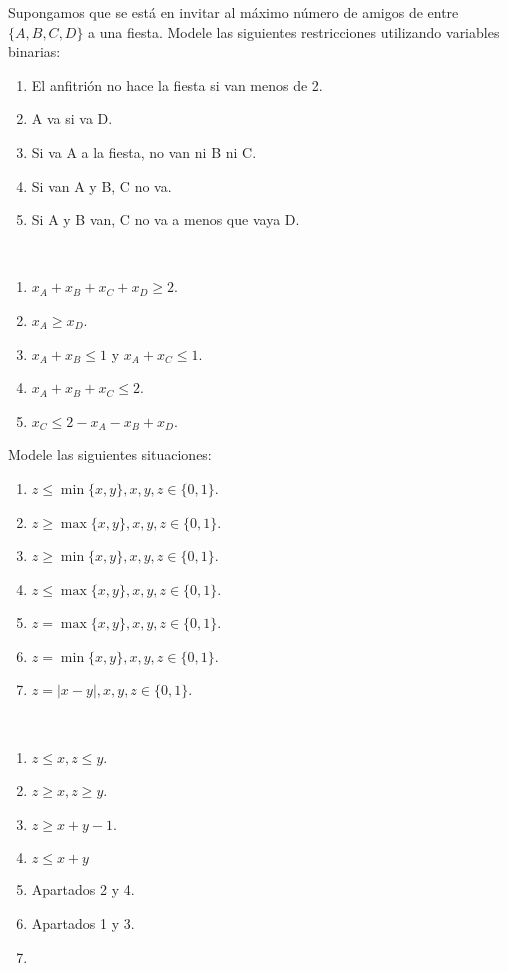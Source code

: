 \documentclass[twoside]{article}
\begin{document}
\begin{ejercicio}{2}
Supongamos que se está en invitar al máximo número de amigos de entre $\{A,B,C,D\}$ a una fiesta. Modele las siguientes restricciones utilizando variables binarias:
\begin{enumerate}
\item El anfitrión no hace la fiesta si van menos de 2.
\item A va si va D.
\item Si va A a la fiesta, no van ni B ni C.
\item Si van A y B, C no va.
\item Si A y B van, C no va a menos que vaya D.
\end{enumerate}
\end{ejercicio}
\begin{solucion}\
\begin{enumerate}
\item $x_A+x_B+x_C+x_D\geq 2$. 
\item $x_A\geq x_D$.
\item $x_A+ x_B\leq 1$ y $x_A+ x_C\leq 1$.  
\item $x_A+x_B+x_C\leq 2$. 
\item $x_C\leq 2-x_A-x_B+x_D$.  
\end{enumerate}
\end{solucion}

\newpage

\begin{ejercicio}{3}
Modele las siguientes situaciones:
\begin{enumerate}
\item $z\leq\min\{x,y\}, x,y,z\in\{0,1\}$.
\item $z\geq\max\{x,y\}, x,y,z\in\{0,1\}$.
\item $z\geq\min\{x,y\}, x,y,z\in\{0,1\}$.
\item $z\leq\max\{x,y\},x,y,z\in\{0,1\}$.
\item $z=\max\{x,y\}, x,y,z\in\{0,1\}$.
\item $z=\min\{x,y\}, x,y,z\in\{0,1\}$.
\item $z=|x-y|, x,y,z\in\{0,1\}$.
\end{enumerate}
\end{ejercicio}
\begin{solucion}\
\begin{enumerate}
\item $z\leq x,z\leq y$. 
\item $z\geq x,z\geq y$.
\item $z\geq x+y-1$.
\item $z\leq x+y$
\item Apartados 2 y 4.
\item Apartados 1 y 3.
\item 
\end{enumerate}
\end{solucion}
\end{document}

